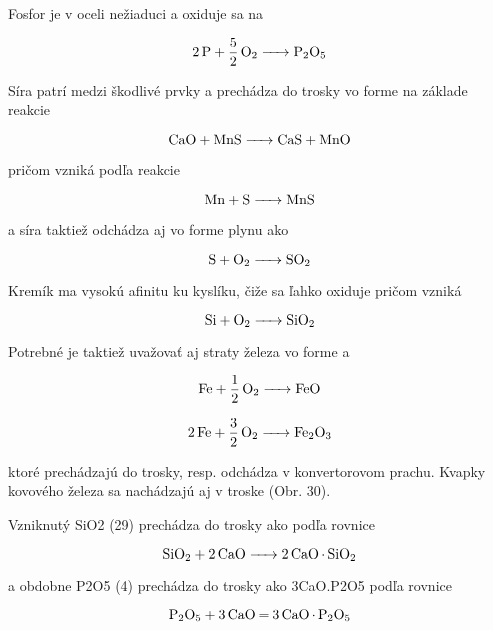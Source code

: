 Fosfor je v oceli nežiaduci a oxiduje sa na 

\begin{equation}
\ce{2P + 5/2O2 -> P2O5}
\end{equation}

Síra patrí medzi škodlivé prvky a prechádza do trosky vo forme  na základe reakcie 

\begin{equation}
\ce{CaO + MnS -> CaS + MnO}
\end{equation}

pričom  vzniká podľa reakcie

\begin{equation}
\ce{Mn + S -> MnS}
\end{equation}

a síra taktiež odchádza aj vo forme plynu ako 

\begin{equation}
\ce{S + O2 -> SO2}
\end{equation}

Kremík ma vysokú afinitu ku kyslíku, čiže sa ľahko oxiduje pričom vzniká 

\begin{equation}
\ce{Si + O2 -> SiO2}
\end{equation}

Potrebné je taktiež uvažovať aj straty železa vo forme  a 

\begin{equation}
\ce{Fe + 1/2O2 -> FeO}
\end{equation}

\begin{equation}
\ce{2Fe + 3/2O2 -> Fe2O3}
\end{equation}

ktoré prechádzajú do trosky, resp.  odchádza v konvertorovom prachu. Kvapky kovového železa sa nachádzajú aj v troske (Obr. 30).


Vzniknutý SiO2 (29) prechádza do trosky ako  podľa rovnice

\begin{equation}
\ce{SiO2 + 2CaO -> 2CaO.SiO2}
\end{equation}

a obdobne P2O5 (4) prechádza do trosky ako 3CaO.P2O5 podľa rovnice

\begin{equation}
\ce{P2O5 + 3CaO = 3CaO.P2O5}
\end{equation}

